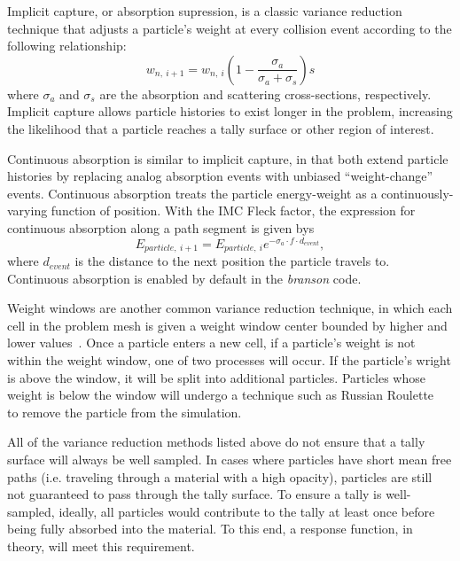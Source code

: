 \documentclass[]{article}
\begin{document}
		Implicit capture, or absorption supression, is a classic variance reduction technique that adjusts a particle's weight at every collision event according to the following relationship:
		\begin{equation}
			w_{n,~i+1} = w_{n,~i}(1 - \frac{\sigma_{a}}{\sigma_{a} + \sigma_{s}})s
		\end{equation}
where $\sigma_{a}$ and $\sigma_{s}$ are the absorption and scattering cross-sections, respectively. Implicit capture allows particle histories to exist longer in the problem, increasing the likelihood that a particle reaches a tally surface or other region of interest. 
	
	    Continuous absorption is similar to implicit capture, in that both extend particle histories by replacing analog absorption events with unbiased ``weight-change'' events.  Continuous absorption treats the particle energy-weight as a continuously-varying function of position. With the IMC Fleck factor, the expression for continuous absorption along a path segment is given bys
		\begin{equation} \label{Eq: new_E}
			E_{particle,~i+1} = E_{particle,~i}e^{-\sigma_{a} \cdot f \cdot d_{event}},
		\end{equation}
		where $d_{event}$ is the distance to the next position the particle travels to.  Continuous absorption is enabled by default in the \textit{branson} code.

		Weight windows are another common variance reduction technique, in which each cell in the problem mesh is given a weight window center bounded by higher and lower values~\cite{JL16}. Once a particle enters a new cell, if a particle's weight is not within the weight window, one of two processes will occur. If the particle's wright is above the window, it will be split into additional particles. Particles whose weight is below the window will undergo a technique such as Russian Roulette~\cite{LM93} to remove the particle from the simulation.

		All of the variance reduction methods listed above do not ensure that a tally surface will always be well sampled. In cases where particles have short mean free paths (i.e. traveling through a material with a high opacity), particles are still not guaranteed to pass through the tally surface. To ensure a tally is  well-sampled, ideally, all particles would contribute to the tally at least once before being fully absorbed into the material. To this end, a response function, in theory, will meet this requirement.
\end{document}
